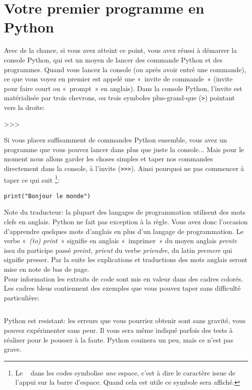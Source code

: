 \section{Votre premier programme en Python}

Avec de la chance, si vous avez atteint ce point, vous avez réussi à démarrer la console Python, qui est un moyen de lancer des commande Python et des programmes. Quand vous lancez la console (ou après avoir entré une commande), ce que vous voyez en premier est appelé une «~invite de commande~» (invite pour faire court ou «~prompt~» en anglais). 
Dans la console Python, l'invite est matérialisée par trois chevrons, ou trois symboles plus-grand-que (\verb+>+) pointant vers la droite:
\begin{Verbatim*}[frame=single,rulecolor=\color{gray}, label=ne pas saisir]
>>>
\end{Verbatim*}
Si vous placez suffisamment de commandes Python ensemble, vous avez un programme que vous pouvez lancer dans plus que juste la console... Mais pour le moment nous allons garder les choses simples et taper nos commandes directement dans la console, à l'invite (\verb+>>>+).
\VerbatimFootnotes
Ainsi pourquoi ne pas commencer à taper ce qui suit
\footnote{Le \verb*+ + dans les codes symbolise \emph{une} espace, c'est à dire le caractère issue de l'appui sur la barre d'espace. Quand cela est utile ce symbole sera affiché.}:

\begin{Verbatim}[frame=single,rulecolor=\color{mbleu}, label=à taper]
print("Bonjour le monde")
\end{Verbatim}

Note du traducteur: la plupart des langages de programmation utilisent des mots clefs en anglais. Python ne fait pas exception à la règle. Vous avez donc l'occasion d'apprendre quelques mots d'anglais en plus d'un langage de programmation. Le verbe «~\emph{(to) print}~» signifie en anglais «~imprimer~» du moyen anglais \emph{prente} issu du participe passé \emph{preint, prient} du verbe \emph{priendre}, du latin \emph{premere} qui signifie presser. Par la suite les explications et traductions des mots anglais seront mise en note de bas de page.\\

Pour information les extraits de code sont mis en valeur dans des cadres colorés. 
Les cadres bleus contiennent des exemples que vous pouvez taper sans difficulté particulière:

\begin{Verbatim}[frame=single,rulecolor=\color{mbleu}, label=à taper]

\end{Verbatim}
Python est resistant: les erreurs que vous pourriez obtenir sont sans gravité, vous pouvez expérimenter sans peur.
Il vous sera même indiqué parfois des tests à réaliser pour le pousser à la faute. Python couinera un peu, mais ce n'est pas grave.


